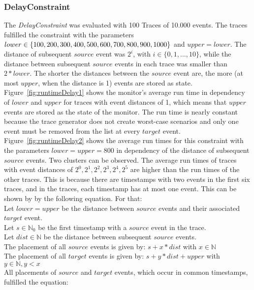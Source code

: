 \subsubsection{DelayConstraint}
	The \textit{DelayConstraint} was evaluated with 100 Traces of 10.000 events. The traces fulfilled the constraint with the parameters $lower\in\{100, 200, 300, 400, 500, 600, 700, 800,\\ 900, 1000\}$ and $upper=lower$.  The distance of subsequent $source$ event was $2^i$, with $i\in \{0, 1, ..., 10\}$, while the distance between subsequent $source$ events in each trace was smaller than $2*lower$. The shorter the distances between the $source$ event are, the more (at most $upper$, when the distance is 1) events are stored as state.\\
	Figure~\ref{fig:runtimeDelay1} shows the monitor's average run time in dependency of $lower$ and $upper$ for traces with event distances of 1, which means that $upper$ events are stored as the state of the monitor. The run time is nearly constant because the trace generator does not create worst-case scenarios and only one event must be removed from the list at every $target$ event.\\
	Figure~\ref{fig:runtimeDelay2} shows the average run times for this constraint with the parameters $lower=upper=800$ in dependency of the distance of subsequent $source$ events. Two clusters can be observed. The average run times of traces with event distances of $2^0, 2^1,2^2,2^3,2^4,2^5$ are higher than the run times of the other traces. This is because there are timestamps with two events in the first six traces, and in the traces, each timestamp has at most one event. This can be shown by by the following equation. For that:\\
		Let $lower=upper$ be the distance between $source$ events and their associated $target$ event.\\
		Let $s\in\mathbb{N}_0$ be the first timestamp with a $source$ event in the trace.\\
		Let $dist\in\mathbb{N}$ be the distance between subsequent $source$ events.\\
		The placement of all $source$ events is given by: $s+x*dist$ with $x\in\mathbb N$\\
		The placement of all $target$ events is given by: $s+y*dist + upper$ with $y\in\mathbb N, y<x$\\
		All placements of $source$ and $target$ events, which occur in common timestamps, fulfilled the equation:\\
